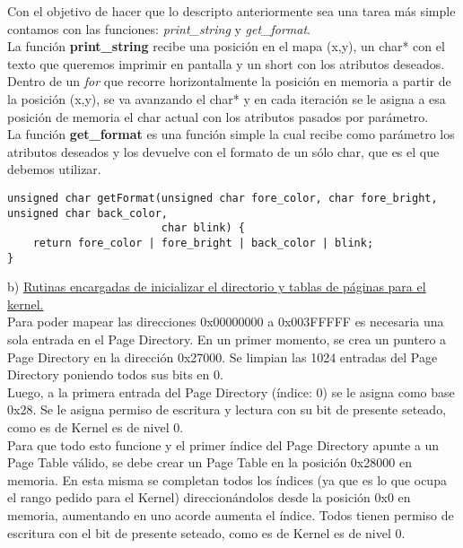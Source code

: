 \documentclass[a4paper]{article}
\begin{document}
Con el objetivo de hacer que lo descripto anteriormente sea una tarea m\'as simple contamos con las funciones: \emph{print_string} y \emph{get_format}.\\

La funci\'on \textbf{print_string} recibe una posici\'on en el mapa (x,y), un char* con el texto que queremos imprimir en pantalla y un short con los atributos deseados. Dentro de un \textit{for} que recorre horizontalmente la posici\'on en memoria a partir de la posici\'on (x,y), se va avanzando el char* y en cada iteraci\'on se le asigna a esa posici\'on de memoria el char actual con los atributos pasados por par\'ametro.\\

La funci\'on \textbf{get_format} es una funci\'on simple la cual recibe como par\'ametro los atributos deseados y los devuelve con el formato de un s\'olo char, que es el que debemos utilizar.
\begin{codesnippet}
\begin{verbatim}
unsigned char getFormat(unsigned char fore_color, char fore_bright, unsigned char back_color, 
                        char blink) {
    return fore_color | fore_bright | back_color | blink; 
}
\end{verbatim}
\end{codesnippet}

\newpage
{\large b)} \underline{Rutinas encargadas de inicializar el directorio y tablas de p\'aginas para el kernel.}\\

Para poder mapear las direcciones 0x00000000 a 0x003FFFFF es necesaria una sola entrada en el Page Directory. En un primer momento, se crea un puntero a Page Directory en la direcci\'on 0x27000. Se limpian las 1024 entradas del Page Directory poniendo todos sus bits en 0.\\

Luego, a la primera entrada del Page Directory (\'indice: 0) se le asigna como base 0x28. Se le asigna permiso de escritura y lectura con su bit de presente seteado, como es de Kernel es de nivel 0.\\

Para que todo esto funcione y el primer \'indice del Page Directory apunte a un Page Table v\'alido, se debe crear un Page Table en la posici\'on 0x28000 en memoria. En esta misma se completan todos los \'indices (ya que es lo que ocupa el rango pedido para el Kernel) direccion\'andolos desde la posici\'on 0x0 en memoria, aumentando en uno acorde aumenta el \'indice. Todos tienen permiso de escritura con el bit de presente seteado, como es de Kernel es de nivel 0.\\
\end{document}

